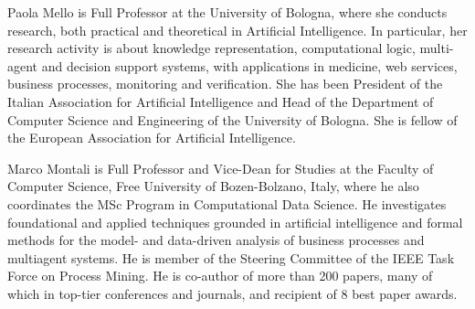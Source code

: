 \documentclass[10pt,journal,compsoc]{IEEEtran}
\theoremstyle{definition}
\theoremstyle{plain}
\begin{document}
\begin{IEEEbiography}{Paola Mello}
is Full Professor at the University of Bologna, where she conducts research, both practical and theoretical in Artificial Intelligence. In particular, her research activity is  about knowledge representation, computational logic, multi-agent and  decision support systems, with applications in medicine, web services, business processes, monitoring and verification.  She has been President of the Italian Association for Artificial Intelligence and Head of the Department of Computer Science and Engineering of the University of Bologna. She is fellow of the European Association for Artificial Intelligence.
\end{IEEEbiography}

\begin{IEEEbiography}{Marco Montali}
is Full Professor and Vice-Dean for Studies at the Faculty of Computer Science, Free University of Bozen-Bolzano, Italy, where he also coordinates the MSc Program in Computational Data Science. He investigates foundational and applied techniques grounded in artificial intelligence and formal methods for the model- and data-driven analysis of business processes and multiagent systems. He is member of the Steering Committee of the IEEE Task Force on Process Mining. He is co-author of more than 200 papers, many of which in top-tier conferences and journals, and recipient of 8 best paper awards.\end{IEEEbiography}
\end{document}
